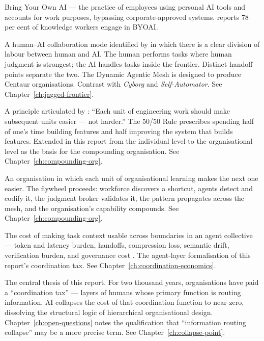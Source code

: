 \begin{description}[style=nextline, leftmargin=2em, font=\bfseries\color{navyblue}]
\item[BYOAI]
Bring Your Own AI --- the practice of employees using personal AI tools and accounts for work purposes, bypassing corporate-approved systems. \textcite{MicrosoftWorkTrend2024} reports 78 per cent of knowledge workers engage in BYOAI.

\item[Centaur]
A human--AI collaboration mode identified by \textcite{Randazzo2024} in which there is a clear division of labour between human and AI. The human performs tasks where human judgment is strongest; the AI handles tasks inside the frontier. Distinct handoff points separate the two. The Dynamic Agentic Mesh is designed to produce Centaur organisations. Contrast with \emph{Cyborg} and \emph{Self-Automator}. See Chapter~\ref{ch:jagged-frontier}.

\item[Compound Engineering]
A principle articulated by \textcite{Klaassen2025}: ``Each unit of engineering work should make subsequent units easier --- not harder.'' The 50/50 Rule prescribes spending half of one's time building features and half improving the system that builds features. Extended in this report from the individual level to the organisational level as the basis for the compounding organisation. See Chapter~\ref{ch:compounding-org}.

\item[Compounding Organisation]
An organisation in which each unit of organisational learning makes the next one easier. The flywheel proceeds: workforce discovers a shortcut, agents detect and codify it, the judgment broker validates it, the pattern propagates across the mesh, and the organisation's capability compounds. See Chapter~\ref{ch:compounding-org}.

\item[Contextual Transaction Cost (CTC)]
The cost of making task context usable across boundaries in an agent collective --- token and latency burden, handoffs, compression loss, semantic drift, verification burden, and governance cost \parencite{Liu2026}. The agent-layer formalisation of this report's coordination tax. See Chapter~\ref{ch:coordination-economics}.

\item[Coordination Collapse]
The central thesis of this report. For two thousand years, organisations have paid a ``coordination tax'' --- layers of humans whose primary function is routing information. AI collapses the cost of that coordination function to near-zero, dissolving the structural logic of hierarchical organisational design. Chapter~\ref{ch:open-questions} notes the qualification that ``information routing collapse'' may be a more precise term. See Chapter~\ref{ch:collapse-point}.


\end{description}

